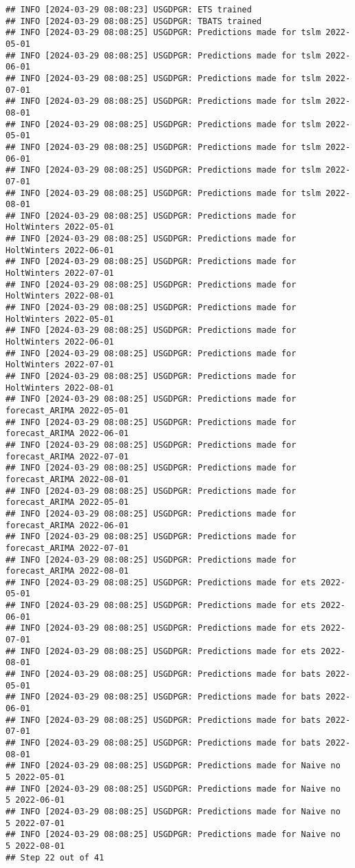 \documentclass[
]{article}
\begin{document}
\begin{verbatim}
## INFO [2024-03-29 08:08:23] USGDPGR: ETS trained
## INFO [2024-03-29 08:08:25] USGDPGR: TBATS trained
## INFO [2024-03-29 08:08:25] USGDPGR: Predictions made for tslm 2022-05-01
## INFO [2024-03-29 08:08:25] USGDPGR: Predictions made for tslm 2022-06-01
## INFO [2024-03-29 08:08:25] USGDPGR: Predictions made for tslm 2022-07-01
## INFO [2024-03-29 08:08:25] USGDPGR: Predictions made for tslm 2022-08-01
## INFO [2024-03-29 08:08:25] USGDPGR: Predictions made for tslm 2022-05-01
## INFO [2024-03-29 08:08:25] USGDPGR: Predictions made for tslm 2022-06-01
## INFO [2024-03-29 08:08:25] USGDPGR: Predictions made for tslm 2022-07-01
## INFO [2024-03-29 08:08:25] USGDPGR: Predictions made for tslm 2022-08-01
## INFO [2024-03-29 08:08:25] USGDPGR: Predictions made for HoltWinters 2022-05-01
## INFO [2024-03-29 08:08:25] USGDPGR: Predictions made for HoltWinters 2022-06-01
## INFO [2024-03-29 08:08:25] USGDPGR: Predictions made for HoltWinters 2022-07-01
## INFO [2024-03-29 08:08:25] USGDPGR: Predictions made for HoltWinters 2022-08-01
## INFO [2024-03-29 08:08:25] USGDPGR: Predictions made for HoltWinters 2022-05-01
## INFO [2024-03-29 08:08:25] USGDPGR: Predictions made for HoltWinters 2022-06-01
## INFO [2024-03-29 08:08:25] USGDPGR: Predictions made for HoltWinters 2022-07-01
## INFO [2024-03-29 08:08:25] USGDPGR: Predictions made for HoltWinters 2022-08-01
## INFO [2024-03-29 08:08:25] USGDPGR: Predictions made for forecast_ARIMA 2022-05-01
## INFO [2024-03-29 08:08:25] USGDPGR: Predictions made for forecast_ARIMA 2022-06-01
## INFO [2024-03-29 08:08:25] USGDPGR: Predictions made for forecast_ARIMA 2022-07-01
## INFO [2024-03-29 08:08:25] USGDPGR: Predictions made for forecast_ARIMA 2022-08-01
## INFO [2024-03-29 08:08:25] USGDPGR: Predictions made for forecast_ARIMA 2022-05-01
## INFO [2024-03-29 08:08:25] USGDPGR: Predictions made for forecast_ARIMA 2022-06-01
## INFO [2024-03-29 08:08:25] USGDPGR: Predictions made for forecast_ARIMA 2022-07-01
## INFO [2024-03-29 08:08:25] USGDPGR: Predictions made for forecast_ARIMA 2022-08-01
## INFO [2024-03-29 08:08:25] USGDPGR: Predictions made for ets 2022-05-01
## INFO [2024-03-29 08:08:25] USGDPGR: Predictions made for ets 2022-06-01
## INFO [2024-03-29 08:08:25] USGDPGR: Predictions made for ets 2022-07-01
## INFO [2024-03-29 08:08:25] USGDPGR: Predictions made for ets 2022-08-01
## INFO [2024-03-29 08:08:25] USGDPGR: Predictions made for bats 2022-05-01
## INFO [2024-03-29 08:08:25] USGDPGR: Predictions made for bats 2022-06-01
## INFO [2024-03-29 08:08:25] USGDPGR: Predictions made for bats 2022-07-01
## INFO [2024-03-29 08:08:25] USGDPGR: Predictions made for bats 2022-08-01
## INFO [2024-03-29 08:08:25] USGDPGR: Predictions made for Naive no  5 2022-05-01
## INFO [2024-03-29 08:08:25] USGDPGR: Predictions made for Naive no  5 2022-06-01
## INFO [2024-03-29 08:08:25] USGDPGR: Predictions made for Naive no  5 2022-07-01
## INFO [2024-03-29 08:08:25] USGDPGR: Predictions made for Naive no  5 2022-08-01
## Step 22 out of 41
\end{verbatim}
\end{document}
